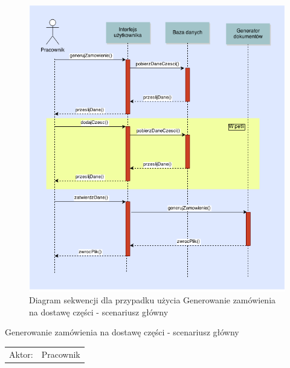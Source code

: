 \begin{figure}[h!]
    \includegraphics[width=\textwidth,
    height=0.7\textheight]{graphics/UseCase/Czesci/GenerowanieZamowieniaSD.png}
  \caption{Diagram sekwencji dla przypadku użycia Generowanie zamówienia na dostawę części - scenariusz główny}
\end{figure}
  \item Generowanie zamówienia na dostawę części - scenariusz główny \\
  \begin{tabularx}{\linewidth}{ c X}
  Aktor: & Pracownik \\
  \end{tabularx}
